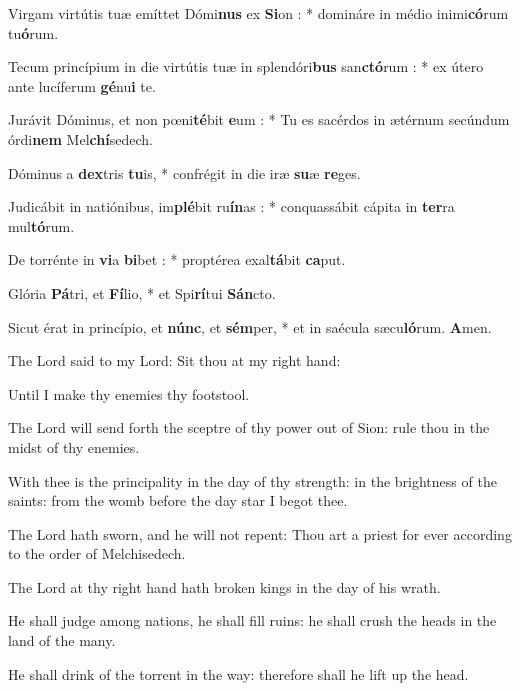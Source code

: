 \documentclass[letterpaper,12pt]{article} %
\begin{document}
\large
{}
\normalsize
\setlength{\columnsep}{18pt}
\setlength{\columnseprule}{.4pt}
\begin{multicols}{2}
\begin{psalmverses}[2]
\item Virgam virtútis tuæ emíttet Dómi\textbf{nus} ex \textbf{Si}on : * domináre in médio inimi\textbf{có}rum tu\textbf{ó}rum.
\item Tecum princípium in die virtútis tuæ in splendóri\textbf{bus} san\textbf{ctó}rum : * ex útero ante lucíferum \textbf{gé}nu\textbf{i} te.
\item Jurávit Dóminus, et non pœni\textbf{té}bit \textbf{e}um : * Tu es sacérdos in ætérnum secúndum órdi\textbf{nem} Mel\textbf{chí}sedech.
\item Dóminus a \textbf{dex}tris \textbf{tu}is, * confrégit in die iræ \textbf{su}æ \textbf{re}ges.
\item Judicábit in natiónibus, im\textbf{plé}bit ru\textbf{ín}as : * conquassábit cápita in \textbf{ter}ra mul\textbf{tó}rum.
\item De torrénte in \textbf{vi}a \textbf{bi}bet : * proptérea exal\textbf{tá}bit \textbf{ca}put.
\item Glória \textbf{Pá}tri, et \textbf{Fí}lio, * et Spi\textbf{rí}tui \textbf{Sán}cto.
\item Sicut érat in princípio, et \textbf{núnc}, et \textbf{sém}per, * et in saécula sæcu\textbf{ló}rum. \textbf{A}men.\end{psalmverses}
\columnbreak
\begin{psalmverses}
\item The Lord said to my Lord: Sit thou at my right hand: 
\item Until I make thy enemies thy footstool.
\item The Lord will send forth the sceptre of thy power out of Sion: rule thou in the midst of thy enemies.
\item With thee is the principality in the day of thy strength: in the brightness of the saints: from the womb before the day star I begot thee.
\item The Lord hath sworn, and he will not repent: Thou art a priest for ever according to the order of Melchisedech.
\item The Lord at thy right hand hath broken kings in the day of his wrath.
\item He shall judge among nations, he shall fill ruins: he shall crush the heads in the land of the many.
\item He shall drink of the torrent in the way: therefore shall he lift up the head.
\end{psalmverses}
\end{multicols}
\pagebreak
\end{document}
